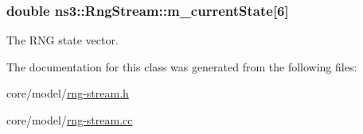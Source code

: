\subsubsection[{\texorpdfstring{m\+\_\+current\+State}{m_currentState}}]{\setlength{\rightskip}{0pt plus 5cm}double ns3\+::\+Rng\+Stream\+::m\+\_\+current\+State\mbox{[}6\mbox{]}\hspace{0.3cm}{\ttfamily [private]}}\hypertarget{classns3_1_1RngStream_a598f63b0d43cf513170b25b70d9e23f1}{}\label{classns3_1_1RngStream_a598f63b0d43cf513170b25b70d9e23f1}
The R\+NG state vector. 

The documentation for this class was generated from the following files\+:\begin{DoxyCompactItemize}
\item 
core/model/\hyperlink{rng-stream_8h}{rng-\/stream.\+h}\item 
core/model/\hyperlink{rng-stream_8cc}{rng-\/stream.\+cc}\end{DoxyCompactItemize}
